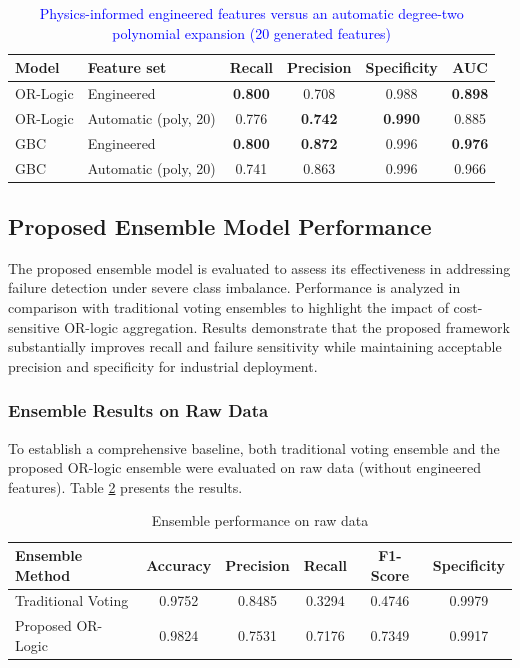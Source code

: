 \documentclass[final,5p, twocolumn]{elsarticle}
\begin{document}
\begin{table}[htbp]
\centering
\caption{\textcolor{blue}{Physics-informed engineered features versus an automatic degree-two polynomial expansion (20 generated features)}}
\label{tab:autofeat}
\begin{tabular}{llcccc}
\hline
Model & Feature set & Recall & Precision & Specificity & AUC \\
\hline
OR-Logic & Engineered & \textbf{0.800} & 0.708 & 0.988 & \textbf{0.898} \\
OR-Logic & Automatic (poly, 20) & 0.776 & \textbf{0.742} & \textbf{0.990} & 0.885 \\
GBC & Engineered & \textbf{0.800} & \textbf{0.872} & 0.996 & \textbf{0.976} \\
GBC & Automatic (poly, 20) & 0.741 & 0.863 & 0.996 & 0.966 \\
\hline
\end{tabular}
\end{table}

\subsection{Proposed Ensemble Model Performance}
\label{sec:ensemble_performance}

The proposed ensemble model is evaluated to assess its effectiveness in addressing failure detection under severe class imbalance. Performance is analyzed in comparison with traditional voting ensembles to highlight the impact of cost-sensitive OR-logic aggregation. Results demonstrate that the proposed framework substantially improves recall and failure sensitivity while maintaining acceptable precision and specificity for industrial deployment.


\subsubsection{Ensemble Results on Raw Data}

To establish a comprehensive baseline, both traditional voting ensemble and the proposed OR-logic ensemble were evaluated on raw data (without engineered features). Table \ref{tab:ensemble_raw} presents the results.

\begin{table}[htbp]
\centering
\caption{Ensemble performance on raw data}
\label{tab:ensemble_raw}
\begin{tabular}{lccccc}
\hline
\textbf{Ensemble Method} & \textbf{Accuracy} & \textbf{Precision} & \textbf{Recall} & \textbf{F1-Score} & \textbf{Specificity} \\
\hline
Traditional Voting & 0.9752 & 0.8485 & 0.3294 & 0.4746 & 0.9979 \\
Proposed OR-Logic & 0.9824 & 0.7531 & 0.7176 & 0.7349 & 0.9917 \\
\hline
\end{tabular}
\end{table}
\end{document}
